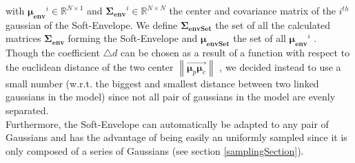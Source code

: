 \documentclass[letterpaper, 10 pt, conference]{ieeeconf}  %
\newcommand{\mb}[1]{{\boldsymbol{#1}}}
\newcommand\norm[1]{\left\lVert#1\right\rVert}
\begin{document}
with $\mb{\mu_{env}}^i \in \mathbb{R}^{N \times 1}$ and $\mb{\Sigma_{env}}^i \in \mathbb{R}^{N \times N}$ the center and covariance matrix of the $i^{th}$ gaussian of the Soft-Envelope. We define $\mb{\Sigma_{envSet}}$ the set of all the calculated matrices $\mb{\Sigma_{env}}$ forming the Soft-Envelope and $\mb{\mu_{envSet}}$ the set of all $\mb{\mu_{env}}^i$ .\\ 
 Though the coefficient $\triangle d $ can be chosen as a result of a function with respect to the euclidean distance of the two center ${\norm{\overrightarrow{\mb{\mu}_p\mb{\mu}_c}}}$ , we decided instead to use a small number (w.r.t. the biggest and smallest distance between two linked gaussians in the model) since not all pair of gaussians in the model are evenly separated.\\
Furthermore, the Soft-Envelope can automatically be adapted to any pair of Gaussians and has the advantage of being easily an uniformly sampled since it is only composed of a series of Gaussians (see section \ref{samplingSection}).\\
\end{document}
